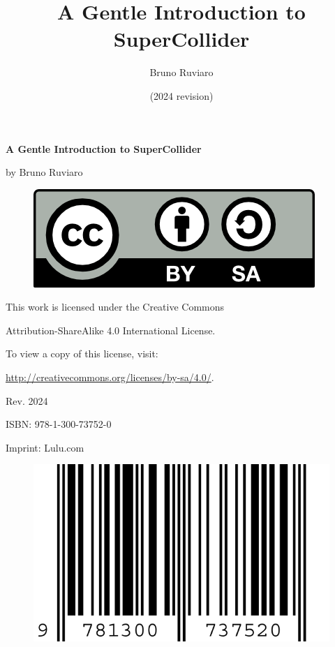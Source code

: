 \documentclass[11pt]{article}
\title{\textbf{A Gentle Introduction to SuperCollider}}
\author{Bruno Ruviaro}
\date{ (2024 revision) }
\begin{document}
\vspace*{\fill}
\begin{center}
{\LARGE \textbf{A Gentle Introduction to SuperCollider}}

\bigskip
by Bruno Ruviaro

\bigskip
\bigskip

\begin{figure}[h]
\begin{center}
\includegraphics[scale=1]{fig-by-sa.png}
\end{center}
\end{figure}

\bigskip
This work is licensed under the Creative Commons

Attribution-ShareAlike 4.0 International License.

To view a copy of this license, visit:

\url{http://creativecommons.org/licenses/by-sa/4.0/}.

\bigskip
Rev. 2024

\bigskip
\bigskip
\bigskip
\bigskip

ISBN: 978-1-300-73752-0

Imprint: Lulu.com
\begin{figure}[h]
\begin{center}
\includegraphics[scale=1]{978-1-300-73752-0.png}
\end{center}
\end{figure}

\end{center}
\end{document}
